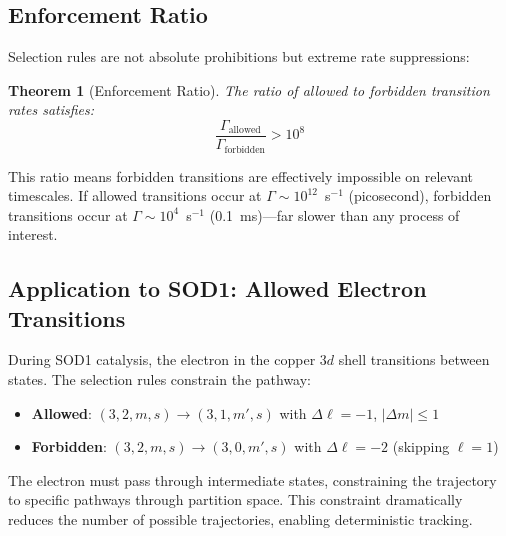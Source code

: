 \documentclass[twocolumn,aps,prx,superscriptaddress,longbibliography]{revtex4-2}
\newtheorem{theorem}{Theorem}[section]
\theoremstyle{remark}
\begin{document}
\subsection{Enforcement Ratio}

Selection rules are not absolute prohibitions but extreme rate suppressions:

\begin{theorem}[Enforcement Ratio]
\label{thm:enforcement}
The ratio of allowed to forbidden transition rates satisfies:
\begin{equation}
\frac{\Gamma_\text{allowed}}{\Gamma_\text{forbidden}} > 10^8
\label{eq:enforcement}
\end{equation}
\end{theorem}

This ratio means forbidden transitions are effectively impossible on
relevant timescales. If allowed transitions occur at $\Gamma \sim 10^{12}$~s$^{-1}$
(picosecond), forbidden transitions occur at $\Gamma \sim 10^{4}$~s$^{-1}$
(0.1~ms)---far slower than any process of interest.

\subsection{Application to SOD1: Allowed Electron Transitions}

During SOD1 catalysis, the electron in the copper $3d$ shell transitions
between states. The selection rules constrain the pathway:

\begin{itemize}
    \item \textbf{Allowed}: $(3,2,m,s) \to (3,1,m',s)$ with
    $\Delta\ell = -1$, $|\Delta m| \leq 1$

    \item \textbf{Forbidden}: $(3,2,m,s) \to (3,0,m',s)$ with
    $\Delta\ell = -2$ (skipping $\ell=1$)
\end{itemize}

The electron must pass through intermediate states, constraining the
trajectory to specific pathways through partition space. This constraint
dramatically reduces the number of possible trajectories, enabling
deterministic tracking.
\end{document}
